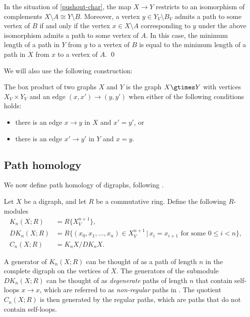 \begin{corollary}\label{pushout-complement}
In the situation of \cref{pushout-char}, the map $X \to Y$ restricts to an isomorphism of complements $X \setminus A \cong Y \setminus B$. 
Moreover, a vertex $y \in Y_V \setminus B_V$ admits a path to some vertex of $B$ if and only if the vertex $x \in X \setminus A$ corresponding to $y$ under the above isomorphism admits a path to some vertex of $A$. In this case, the minimum length of a path in $Y$ from $y$ to a vertex of $B$ is equal to the minimum length of a path in $X$ from $x$ to a vertex of $A$. \qed
\end{corollary}
We will also use the following construction:
\begin{defi}
    The box product of two graphs $X$ and $Y$ is the graph $X \gtimes Y$ with vertices $X_V \times Y_V$
    and an edge $(x,x') \to (y,y')$ when either of the following conditions holds:
    \begin{itemize}
        \item there is an edge $x \to y$ in $X$ and $x' = y'$, or
        \item there is an edge $x' \to y'$ in $Y$ and $x = y$.
    \end{itemize}
\end{defi}

\subsection{Path homology}

We now define path homology of digraphs, following \cite{grigor'yan-lin-muranov-yau:unpublished,grigor'yan-lin-muranov-yau:homotopy}. 

\begin{defi} \label{def:chain-all-paths}
Let $X$ be a digraph, and let $R$ be a commutative ring.
Define the following $R$-modules
\begin{align*}
    K_n (X ; R) &= R \{X_V^{n+1}\}, \\
    DK_n (X ; R) &= R \{ (x_0, x_1, \dots, x_n ) \in X_V^{n+1} \,|\, x_i = x_{i+1} \text{ for some } 0 \leq i < n \}, \\
    C_n (X ; R) & = K_n X / DK_n X.
\end{align*}
\end{defi}

A generator of $K_n (X ; R)$ can be thought of as a path of length $n$ in the complete digraph on the vertices of $X$.
The generators of the submodule $DK_n (X ; R)$ can be thought of as \emph{degenerate} paths of length $n$ that contain self-loops $x \to x$, which are referred to as \emph{non-regular} paths in \cite[\S2.3]{grigor'yan-lin-muranov-yau:unpublished}.
The quotient $C_n (X ; R)$ is then generated by the regular paths, which are paths that do not contain self-loops.

